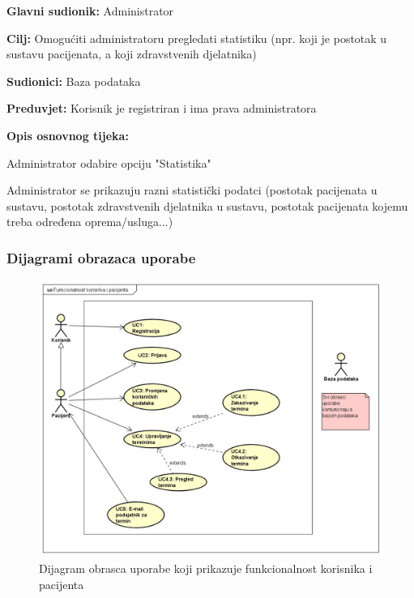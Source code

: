 \noindent {}
\begin{packed_item}
	
	\item \textbf{Glavni sudionik: }Administrator
	\item  \textbf{Cilj:} Omogućiti administratoru pregledati statistiku (npr. koji je postotak u sustavu pacijenata, a koji zdravstvenih djelatnika)
	\item  \textbf{Sudionici:} Baza podataka
	\item  \textbf{Preduvjet:} Korisnik je registriran i ima prava administratora
	\item  \textbf{Opis osnovnog tijeka:}
	
	\item[] \begin{packed_enum}
		
		\item Administrator odabire opciju "Statistika"
		\item Administrator se prikazuju razni statistički podatci (postotak pacijenata u sustavu, postotak zdravstvenih djelatnika u sustavu, postotak pacijenata kojemu treba određena oprema/usluga...)
	\end{packed_enum}
	
\end{packed_item}



\subsubsection{Dijagrami obrazaca uporabe}

\begin{figure}[H]
	\includegraphics[scale=0.6]{slike/KorisnikIPacijent.PNG} %
	\centering
	\caption{Dijagram obrasca uporabe koji prikazuje funkcionalnost korisnika i pacijenta}
	\label{fig:promjene}
\end{figure}

